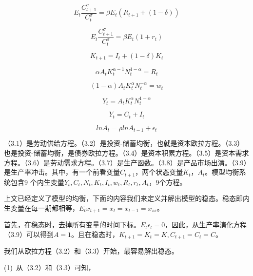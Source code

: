 \documentclass[cn,10pt,math=newtx,citestyle=gb7714-2015,bibstyle=gb7714-2015]{elegantbook}
\begin{document}
	\begin{equation}\label{label}
		E_t\frac{C_{t+1}^{\sigma}}{C_t^{\sigma}}=\beta E_t(R_{t+1}+(1-\delta))
	\end{equation}
	
	\begin{equation}\label{label}
		E_t\frac{C_{t+1}^{\sigma}}{C_t^{\sigma}}=\beta E_t(1+r_t)
	\end{equation}
	
	\begin{equation}\label{label}
		K_{t+1}=I_t+(1-\delta)K_t
	\end{equation}
	
	\begin{equation}\label{label}
		\alpha A_tK_t^{\alpha-1}N_t^{1-\alpha}=R_t
	\end{equation}
	
	\begin{equation}\label{label}
		(1-\alpha)A_tK_t^{\alpha}N_t^{-\alpha}=w_t
	\end{equation}
	
	\begin{equation}\label{label}
		Y_t=A_tK_t^{\alpha}N_t^{1-\alpha}
	\end{equation}
	
	\begin{equation}\label{label}
		Y_t=C_t+I_t
	\end{equation}
	
	\begin{equation}\label{label}
		lnA_t=\rho lnA_{t-1}+\epsilon_t
	\end{equation}
	
	
	（3.1）是劳动供给方程。（3.2）是投资-储蓄均衡，也就是资本欧拉方程。（3.3）也是投资-储蓄均衡，是债券欧拉方程。（3.4）是资本积累方程。（3.5）是资本需求方程。（3.6）是劳动需求方程。（3.7）是生产函数。（3.8）是产品市场出清。（3.9）是生产率冲击。其中，有一个前看变量$C_{t+1}$，两个状态变量$K_t，A_t$。模型均衡系统包含9 个内生变量$Y_t,C_t,N_t,K_t,I_t,w_t,R_t,r_t,A_t$，9个方程。
	
	
	上文已经定义了模型的均衡，下面的内容我们来定义并解出模型的稳态。稳态即内生变量在每一期都相等，$E_tx_{t+1}=x_t=x_{t-1}=x_{ss}$。
	
	首先，在稳态时，去掉所有变量的时间下标。$E_t\epsilon_t=0$，因此，从生产率演化方程（3.9）可以得到$A=1$。且在稳态时，$K_{t+1}=K_t=K,C_{t+1}=C_t=C$。
	
	我们从欧拉方程（3.2）和（3.3）开始，最容易解出稳态。
	
	(1)~从（3.2）和（3.3）可知，
	
\end{document}
